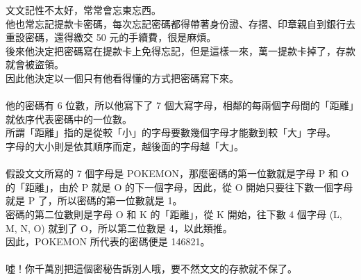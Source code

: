 文文記性不太好，常常會忘東忘西。\\
他也常忘記提款卡密碼，每次忘記密碼都得帶著身份證、存摺、印章親自到銀行去重設密碼，還得繳交 50 元的手續費，很是麻煩。\\
後來他決定把密碼寫在提款卡上免得忘記，但是這樣一來，萬一提款卡掉了，存款就會被盜領。\\
因此他決定以一個只有他看得懂的方式把密碼寫下來。\\
\\
他的密碼有 6 位數，所以他寫下了 7 個大寫字母，相鄰的每兩個字母間的「距離」就依序代表密碼中的一位數。\\
所謂「距離」指的是從較「小」的字母要數幾個字母才能數到較「大」字母。\\
字母的大小則是依其順序而定，越後面的字母越「大」。\\
\\
假設文文所寫的 7 個字母是 POKEMON，那麼密碼的第一位數就是字母 P 和 O 的「距離」，由於 P 就是 O 的下一個字母，因此，從 O 開始只要往下數一個字母就是 P 了，所以密碼的第一位數就是 1。\\
密碼的第二位數則是字母 O 和 K 的「距離」，從 K 開始，往下數 4 個字母 (L, M, N, O) 就到了 O，所以第二位數是 4，以此類推。\\
因此，POKEMON 所代表的密碼便是 146821。\\
\\
噓！你千萬別把這個密秘告訴別人哦，要不然文文的存款就不保了。\\
